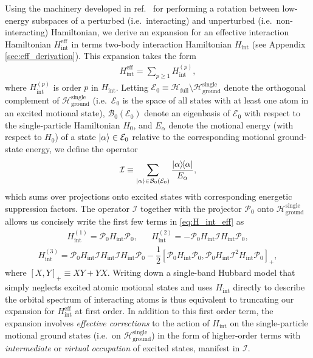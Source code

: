 \documentclass[preprint,showkeys,nofootinbib]{revtex4-1}
\renewcommand{\t}{\text} %
\newcommand{\f}{\dfrac} %
\newcommand{\p}[1]{\left(#1\right)} %
\renewcommand{\sp}[1]{\left[#1\right]} %
\newcommand{\B}{\mathcal{B}}
\newcommand{\E}{\mathcal{E}}
\renewcommand{\H}{\mathcal{H}}
\newcommand{\I}{\mathcal{I}}
\renewcommand{\P}{\mathcal{P}}
\newcommand{\1}{\mathds{1}}
\begin{document}
Using the machinery developed in ref.~\cite{bravyi2011schrieffer} for
performing a rotation between low-energy subspaces of a perturbed
(i.e.~interacting) and unperturbed (i.e.~non-interacting) Hamiltonian,
we derive an expansion for an effective interaction Hamiltonian
$H_{\t{int}}^{\t{eff}}$ in terms two-body interaction Hamiltonian
$H_{\t{int}}$ (see Appendix \ref{sec:eff_derivation}).  This expansion
takes the form
\begin{align}
  H_{\t{int}}^{\t{eff}} = \sum_{p\ge1} H_{\t{int}}^{(p)},
  \label{eq:H_int_eff}
\end{align}
where $H_{\t{int}}^{(p)}$ is order $p$ in $H_{\t{int}}$.  Letting
$\E_0\equiv \H_{\t{full}}\setminus\H_{\t{ground}}^{\t{single}}$ denote
the orthogonal complement of $\H_{\t{ground}}^{\t{single}}$
(i.e.~$\E_0$ is the space of all states with at least one atom in an
excited motional state), $\B_0\p{\E_0}$ denote an eigenbasis of $\E_0$
with respect to the single-particle Hamiltonian $H_0$, and $E_\alpha$
denote the motional energy (with respect to $H_0$) of a state
$\ket\alpha\in\E_0$ relative to the corresponding motional
ground-state energy, we define the operator
\begin{align}
  \I \equiv \sum_{\ket\alpha\in\B_0\p{\E_0}} \f{\op\alpha}{E_\alpha},
\end{align}
which sums over projections onto excited states with corresponding
energetic suppression factors.  The operator $\I$ together with the
projector $\P_0$ onto $\H_{\t{ground}}^{\t{single}}$ allows us
concisely write the first few terms in \eqref{eq:H_int_eff} as
\begin{align}
  H_{\t{int}}^{(1)} = \P_0 H_{\t{int}} \P_0,
  &&
  H_{\t{int}}^{(2)} = -\P_0 H_{\t{int}} \I H_{\t{int}} \P_0,
  \label{eq:H_int_1_2}
\end{align}
\begin{align}
  H_{\t{int}}^{(3)}
  = \P_0 H_{\t{int}} \I H_{\t{int}} \I H_{\t{int}} \P_0
  - \f12\sp{\P_0 H_{\t{int}} \P_0,
    \P_0 H_{\t{int}} \I^2 H_{\t{int}} \P_0}_+,
  \label{eq:H_int_3}
\end{align}
where $\sp{X,Y}_+\equiv XY+YX$.  Writing down a single-band Hubbard
model that simply neglects excited atomic motional states and uses
$H_{\t{int}}$ directly to describe the orbital spectrum of interacting
atoms is thus equivalent to truncating our expansion for
$H_{\t{int}}^{\t{eff}}$ at first order.  In addition to this first
order term, the expansion involves {\it effective corrections} to the
action of $H_{\t{int}}$ on the single-particle motional ground states
(i.e.~on $\H_{\t{ground}}^{\t{single}}$) in the form of higher-order
terms with {\it intermediate} or {\it virtual occupation} of excited
states, manifest in $\I$.
\end{document}
